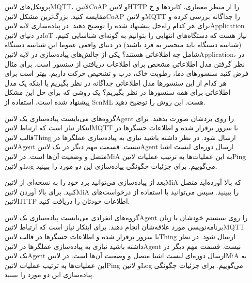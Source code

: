 \documentclass[]{assignment}
\begin{document}

 پروتکل‌های ‌لاتین{MQTT}، ‌لاتین{CoAP} و ‌لاتین{HTTP} را از منظر معماری، کابردها و ‌خ مقایسه کنید.
 بزرگ‌ترین مشکل ‌لاتین{CoAP} و ‌لاتین{MQTT} را جداگانه بررسی کرده و برای هر کدام راه‌حل پیشنهاد شده را توضیح دهید.
 در پیاده‌سازی لایه ‌لاتین{Application} در دنیای ‌لاتین{IoT} نیاز هست که دستگاه‌های انتهایی را بتوانیم به گونه‌ای شناسایی کنیم. (شناسه دستگاه‌ باید منحصر به فرد باشند) در دنیای واقعی عموما این شناسه دستگاه‌ شامل چه اطلاعاتی هستند؟
 یکی از چالش‌های پیاده‌سازی در لایه ‌لاتین{Application}، در نظر گرفتن مدل اطلاعاتی مشخص برای اطلاعات دریافتی از سنسور است.
برای مثال فرض کنید سنسور‌های دما، رطوبت خاک، درب و تشخیص حرکت داریم. بهتر است برای هر کدام از این سنسورها مدل اطلاعاتی جداگانه در نظر بگیریم یا اینکه یک مدل اطلاعاتی برای همه سنسور‌ها در نظر بگیریم؟
یک روشی که برای حل این مشکل پیشنهاد شده است، استفاده از SenML هست. این روش را توضیح دهید.



گروه‌های می‌بایست پیاده‌سازی یک ‌لاتین{Agent} را روی بردشان صورت بدهند.
برای اینکار نیاز است که ارتباط ‌لاتین{MQTT}
با سرور برقرار شده و اطلاعات حسگرها در قالب ‌لاتین{Thing} ارسال شود. در نظر داشته باشید نیازی به پیاده‌سازی عملگرها در ‌لاتین{Agent} نیست.
قسمت مهم دیگر در یک ‌لاتین{Agent} ارسال دوره‌ای لیست اشیا متصل و وضعیت آن‌ها است. در ‌لاتین{MiA} به این عملیات‌ها به ترتیب عملیات
‌لاتین{Ping} و ‌لاتین{Log} می‌گوییم. برای جزئیات چگونگی پیاده‌سازی این دو مورد  را ببینید.

بعد از پیاده‌سازی می‌توانید برد خود را به نسخه‌ای از ‌لاتین{MiA} که بالا آورده‌اید متصل کنید.
برای بالا آوردن ‌لاتین{MiA}  را ببینید.
سپس می‌توانید با استفاده از درخواست‌های ‌لاتین{HTTP} اطلاعات خودتان را دریافت کنید.


گروه‌های انفرادی می‌بایست پیاده‌سازی یک ‌لاتین{Agent} را روی سیستم خودشان با زبان برنامه‌نویسی مورد علاقه‌شان انجام دهند.
برای اینکار نیاز است که ارتباط ‌لاتین{MQTT}
با سرور برقرار شده و اطلاعات حسگرها در قالب ‌لاتین{Thing} ارسال شود. در نظر داشته باشید نیازی به پیاده‌سازی عملگرها در ‌لاتین{Agent} نیست.
قسمت مهم دیگر در یک ‌لاتین{Agent} ارسال دوره‌ای لیست اشیا متصل و وضعیت آن‌ها است. در ‌لاتین{MiA} به این عملیات‌ها به ترتیب عملیات
‌لاتین{Ping} و ‌لاتین{Log} می‌گوییم. برای جزئیات چگونگی پیاده‌سازی این دو مورد  را ببینید.
\end{document}
